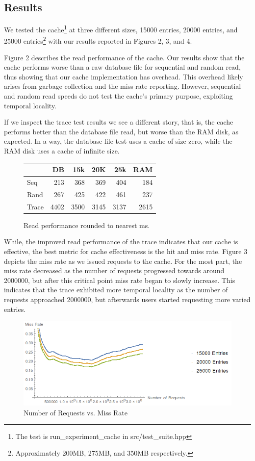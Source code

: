 \documentclass[notitlepage, twocolumn,11pt]{article}
\begin{document}
\subsection{Results}

We tested the cache\footnote{The test is run\_experiment\_cache in src/test\_suite.hpp} at three different sizes, 15000 entries, 20000 entries, and 25000 entries\footnote{Approximately 200MB, 275MB, and 350MB respectively.} with our results reported in Figures 2, 3, and 4.

Figure 2 describes the read performance of the cache.
Our results show that the cache performs worse than a raw database file for sequential and random read, thus showing that our cache implementation has overhead.
This overhead likely arises from garbage collection and the miss rate reporting.
However, sequential and random read speeds do not test the cache's primary purpose, exploiting temporal locality.

If we inspect the trace test results we see a different story, that is, the cache performs better than the database file read, but worse than the RAM disk, as expected.
In a way, the database file test uses a cache of size zero, while the RAM disk uses a cache of infinite size.

\begin{figure}[h!]
\centering
\begin{tabular}{l|r|r|r|r|r}
&DB&15k&20K&25k&RAM\\\hline
Seq & 213 & 368 & 369 & 404 & 184\\\hline
Rand & 267 & 425 & 422 & 461 & 237\\\hline
Trace & 4402 & 3500 & 3145 & 3137 & 2615
\end{tabular}
\caption{Read performance rounded to nearest ms.}
\end{figure}

While, the improved read performance of the trace indicates that our cache is effective, the best metric for cache effectiveness is the hit and miss rate.
Figure 3 depicts the miss rate as we issued requests to the cache.
For the most part, the miss rate decreased as the number of requests progressed towards around 2000000, but after this critical point miss rate began to slowly increase.
This indicates that the trace exhibited more temporal locality as the number of requests approached 2000000, but afterwards users started requesting more varied entries.

\begin{figure}[h!]
\centering
\includegraphics[scale=.4]{graph.png}
\caption{Number of Requests vs. Miss Rate}
\end{figure}
\end{document}
